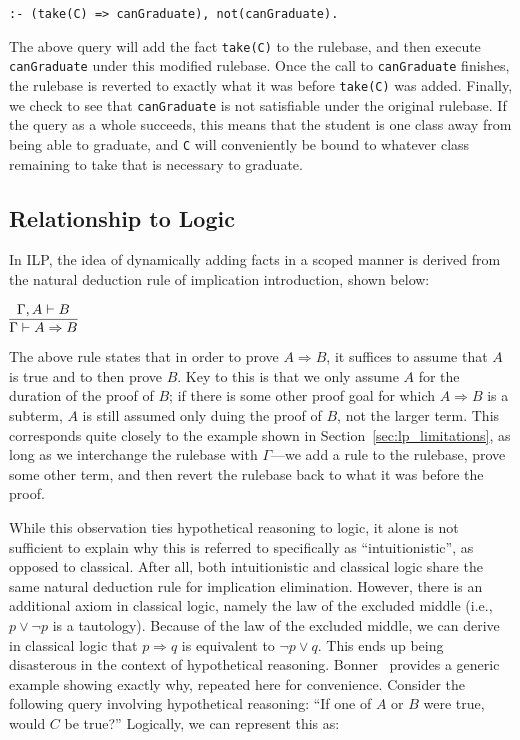 \begin{verbatim}
:- (take(C) => canGraduate), not(canGraduate).
\end{verbatim}

The above query will add the fact \texttt{take(C)} to the rulebase, and then execute \texttt{canGraduate} under this modified rulebase.
Once the call to \texttt{canGraduate} finishes, the rulebase is reverted to exactly what it was before \texttt{take(C)} was added.
Finally, we check to see that \texttt{canGraduate} is not satisfiable under the original rulebase.
If the query as a whole succeeds, this means that the student is one class away from being able to graduate, and \texttt{C} will conveniently be bound to whatever class remaining to take that is necessary to graduate.

\subsection{Relationship to Logic}
In ILP, the idea of dynamically adding facts in a scoped manner is derived from the natural deduction rule of implication introduction, shown below:

\begin{center}
  $\infer{\Gamma \vdash A \Rightarrow B}{\Gamma, A \vdash B}$
\end{center}

\noindent The above rule states that in order to prove $A \Rightarrow B$, it suffices to assume that $A$ is true and to then prove $B$.
Key to this is that we only assume $A$ for the duration of the proof of $B$; if there is some other proof goal for which $A \Rightarrow B$ is a subterm, $A$ is still assumed only duing the proof of $B$, not the larger term.
This corresponds quite closely to the example shown in Section~\ref{sec:lp_limitations}, as long as we interchange the rulebase with $\Gamma$---we add a rule to the rulebase, prove some other term, and then revert the rulebase back to what it was before the proof.

While this observation ties hypothetical reasoning to logic, it alone is not sufficient to explain why this is referred to specifically as ``intuitionistic'', as opposed to classical.
After all, both intuitionistic and classical logic share the same natural deduction rule for implication elimination.
However, there is an additional axiom in classical logic, namely the law of the excluded middle (i.e., $p \lor \neg p$ is a tautology).
Because of the law of the excluded middle, we can derive in classical logic that $p \Rightarrow q$ is equivalent to $\neg p \lor q$.
This ends up being disasterous in the context of hypothetical reasoning.
Bonner~\cite{Bonner88} provides a generic example showing exactly why, repeated here for convenience.
Consider the following query involving hypothetical reasoning: ``If one of $A$ or $B$ were true, would $C$ be true?''
Logically, we can represent this as:

